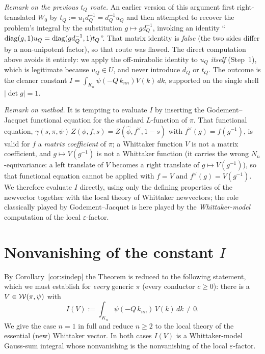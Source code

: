\medskip
\noindent\emph{Remark on the previous $t_Q$ route.} An earlier version of this argument first
right-translated $W_0$ by $t_Q:=u_1d_Q^{-1}=d_Q^{-1}u_Q$ and then attempted to recover the
problem's integral by the substitution $g\mapsto gd_Q^{-1}$, invoking an identity
``$\operatorname{diag}(g,1)u_Q=\operatorname{diag}(gd_Q^{-1},1)t_Q$''. That matrix identity is \emph{false}
\textup{(}the two sides differ by a non-unipotent factor\textup{)}, so that route was flawed. The
direct computation above avoids it entirely: we apply the off-mirabolic identity to $u_Q$
\emph{itself} \textup{(}Step~1\textup{)}, which is legitimate because $u_Q\in U$, and never
introduce $d_Q$ or $t_Q$. The outcome is the cleaner constant
$I=\int_{K_n}\psi(-Q\,k_{nn})V(k)\,dk$, supported on the single shell $|\det g|=1$.

\medskip
\noindent\emph{Remark on method.} It is tempting to evaluate $I$ by inserting the
Godement--Jacquet functional equation for the standard $L$-function of $\pi$. That functional
equation, $\gamma(s,\pi,\psi)\,Z(\phi,f,s)=Z(\widehat\phi,f^\vee,1-s)$ with
$f^\vee(g)=f(g^{-1})$, is valid for $f$ a \emph{matrix coefficient} of $\pi$; a Whittaker
function $V$ is not a matrix coefficient, and $g\mapsto V(g^{-1})$ is not a Whittaker function
\textup{(}it carries the wrong $N_n$-equivariance: a left translate of $V$ becomes a right
translate of $g\mapsto V(g^{-1})$\textup{)}, so that functional equation cannot be applied with
$f=V$ and $f^\vee(g)=V(g^{-1})$. We therefore evaluate $I$ directly, using only the defining
properties of the newvector together with the local theory of Whittaker newvectors; the role
classically played by Godement--Jacquet is here played by the \emph{Whittaker-model} computation
of the local $\varepsilon$-factor.

\section*{Nonvanishing of the constant $I$}

By Corollary~\ref{cor:sindep} the Theorem is reduced to the following statement, which we must
establish for \emph{every} generic $\pi$ \textup{(}every conductor $c\ge0$\textup{)}: there is a
$V\in\mathcal{W}(\pi,\psi)$ with
\[
I(V):=\int_{K_n}\psi(-Q\,k_{nn})\,V(k)\,dk\neq0 .
\]
We give the case $n=1$ in full and reduce $n\ge2$ to the local theory of the essential
\textup{(}new\textup{)} Whittaker vector. In both cases $I(V)$ is a Whittaker-model Gauss-sum
integral whose nonvanishing is the nonvanishing of the local $\varepsilon$-factor.

